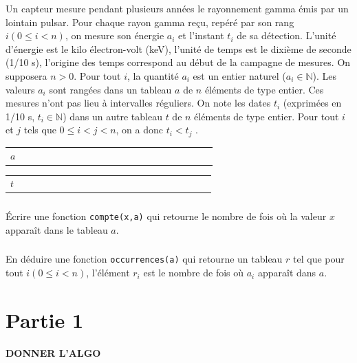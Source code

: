 \documentclass[10pt,fleqn]{article} %
\begin{document}

\vspace{2cm}
\pagestyle{fancy}
\thispagestyle{plain}


Un capteur mesure pendant plusieurs années le rayonnement gamma émis par un lointain pulsar.
Pour chaque rayon gamma reçu, repéré par son rang $i (0 \leq i < n)$, on mesure son énergie $a_i$ et l’instant $t_i$ de sa détection.
L’unité d’énergie est le kilo électron-volt (keV), l’unité de temps est le dixième de seconde (1/10 s), l’origine des temps correspond au début de la campagne de mesures.
On supposera $n > 0$.
Pour tout $i$, la quantité $a_i$ est un entier naturel ($a_i \in \mathbb{N}$).
Les valeurs $a_i$ sont rangées dans un tableau $a$ de $n$ éléments de type entier. Ces mesures n’ont pas lieu à intervalles réguliers.
On note les dates $t_i$ (exprimées en 1/10 s, $t_i \in \mathbb{N}$) dans un autre tableau $t$ de $n$ éléments de type entier.
Pour tout $i$ et $j$ tels que $0 \le i < j < n$, on a donc $t_i < t_j$ .

\begin{center}

\begin{tabular}{p{.5cm}|c|c|c|c|c|c|c|c|c|c|c|c|c|c|c|c|c|c|c|c|}
\cline{2-21}
$a$&&&&&&&&&&&&&&&&&&&&\\
\cline{2-21}
\end{tabular}

\vspace{.1cm}

\begin{tabular}{p{.5cm}|c|c|c|c|c|c|c|c|c|c|c|c|c|c|c|c|c|c|c|c|}
\cline{2-21}
$t$&&&&&&&&&&&&&&&&&&&&\\
\cline{2-21}
\end{tabular}
\end{center}


\setcounter{exo}{0}
\subparagraph{} Écrire une fonction \texttt{compte(x,a)} qui retourne le nombre de fois où la valeur $x$ apparaît dans le tableau $a$.


\subparagraph{} En déduire une fonction \texttt{occurrences(a)} qui retourne un tableau $r$ tel que pour tout $i (0 \le i < n)$, l’élément $r_i$ est le nombre de fois où $a_i$ apparaît dans $a$.

\section{Partie 1}

\textbf{DONNER L'ALGO}
\end{document}
